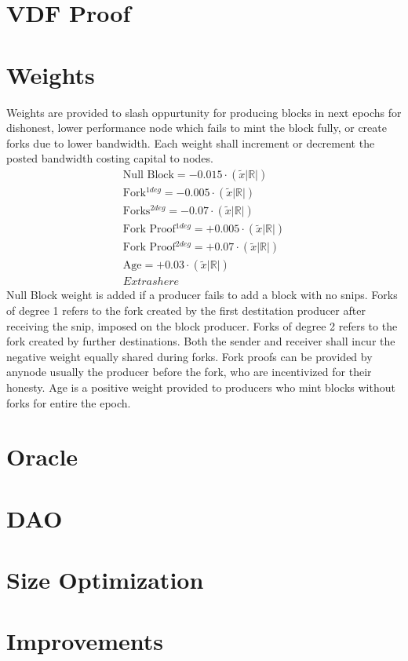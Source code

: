 \documentclass[a4paper,10pt]{article}
\begin{document}
\section{VDF Proof}
\section{Weights}
Weights are provided to slash oppurtunity for producing blocks in next epochs for dishonest, lower performance node which fails to mint the block fully, or create forks due to lower bandwidth. Each weight shall increment or decrement the posted bandwidth costing capital to nodes.
\begin{align*}
\text{Null Block} = -0.015 \cdot (\widetilde{x}|\mathbb{R}|)\\
\text{Fork$^{1deg}$} = -0.005 \cdot (\widetilde{x}|\mathbb{R}|)\\
\text{Forks$^{2deg}$} = -0.07 \cdot (\widetilde{x}|\mathbb{R}|)\\
\text{Fork Proof$^{1deg}$} = +0.005 \cdot (\widetilde{x}|\mathbb{R}|)\\
\text{Fork Proof$^{2deg}$} = +0.07 \cdot (\widetilde{x}|\mathbb{R}|)\\
\text{Age} = +0.03 \cdot (\widetilde{x}|\mathbb{R}|)\\
Extras here
\end{align*}
Null Block weight is added if a producer fails to add a block with no snips. Forks of degree 1 refers to the fork created by the first destitation producer after receiving the snip, imposed on the block producer. Forks of degree 2 refers to the fork created by further destinations. Both the sender and receiver shall incur the negative weight equally shared during forks. Fork proofs can be provided by anynode usually the producer before the fork, who are incentivized for their honesty. Age is a positive weight provided to producers who mint blocks without forks for entire the epoch.
\section{Oracle}
\section{DAO}
\section{Size Optimization}
\section{Improvements}
\end{document}

